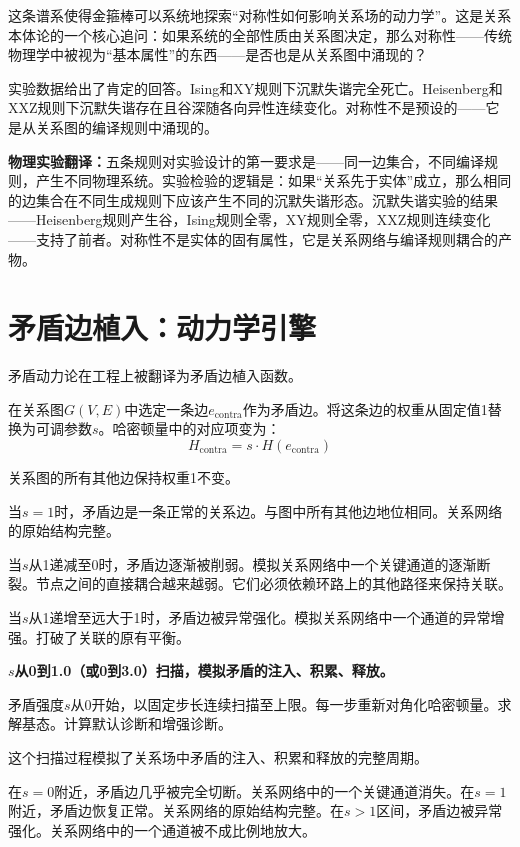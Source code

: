 \documentclass[11pt,a4paper]{book}
\theoremstyle{definition}
\begin{document}
这条谱系使得金箍棒可以系统地探索“对称性如何影响关系场的动力学”。这是关系本体论的一个核心追问：如果系统的全部性质由关系图决定，那么对称性——传统物理学中被视为“基本属性”的东西——是否也是从关系图中涌现的？

实验数据给出了肯定的回答。Ising和XY规则下沉默失谐完全死亡。Heisenberg和XXZ规则下沉默失谐存在且谷深随各向异性连续变化。对称性不是预设的——它是从关系图的编译规则中涌现的。

\textbf{物理实验翻译：}五条规则对实验设计的第一要求是——同一边集合，不同编译规则，产生不同物理系统。实验检验的逻辑是：如果“关系先于实体”成立，那么相同的边集合在不同生成规则下应该产生不同的沉默失谐形态。沉默失谐实验的结果——Heisenberg规则产生谷，Ising规则全零，XY规则全零，XXZ规则连续变化——支持了前者。对称性不是实体的固有属性，它是关系网络与编译规则耦合的产物。

\section{矛盾边植入：动力学引擎}

矛盾动力论在工程上被翻译为矛盾边植入函数。

在关系图$G(V,E)$中选定一条边$e_{\text{contra}}$作为矛盾边。将这条边的权重从固定值1替换为可调参数$s$。哈密顿量中的对应项变为：
\begin{equation}
H_{\text{contra}} = s \cdot H(e_{\text{contra}})
\end{equation}

关系图的所有其他边保持权重1不变。

当$s=1$时，矛盾边是一条正常的关系边。与图中所有其他边地位相同。关系网络的原始结构完整。

当$s$从1递减至0时，矛盾边逐渐被削弱。模拟关系网络中一个关键通道的逐渐断裂。节点之间的直接耦合越来越弱。它们必须依赖环路上的其他路径来保持关联。

当$s$从1递增至远大于1时，矛盾边被异常强化。模拟关系网络中一个通道的异常增强。打破了关联的原有平衡。

\textbf{$s$从0到1.0（或0到3.0）扫描，模拟矛盾的注入、积累、释放。}

矛盾强度$s$从0开始，以固定步长连续扫描至上限。每一步重新对角化哈密顿量。求解基态。计算默认诊断和增强诊断。

这个扫描过程模拟了关系场中矛盾的注入、积累和释放的完整周期。

在$s=0$附近，矛盾边几乎被完全切断。关系网络中的一个关键通道消失。在$s=1$附近，矛盾边恢复正常。关系网络的原始结构完整。在$s>1$区间，矛盾边被异常强化。关系网络中的一个通道被不成比例地放大。
\end{document}
